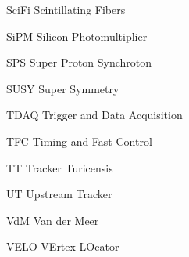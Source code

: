 \begin{abbreviations}
    \item[SciFi] Scintillating Fibers
    \item[SiPM] Silicon Photomultiplier
    \item[SPS] Super Proton Synchroton
    \item[SUSY] Super Symmetry
    \item[TDAQ] Trigger and Data Acquisition
    \item[TFC] Timing and Fast Control
    \item[TT] Tracker Turicensis
    \item[UT] Upstream Tracker
    \item[VdM] Van der Meer
    \item[VELO] VErtex LOcator
\end{abbreviations}

